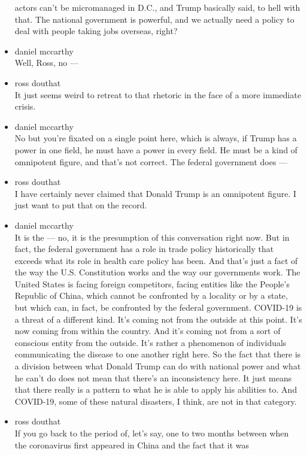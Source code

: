 \begin{itemize}
  actors can't be micromanaged in D.C., and Trump basically said, to
  hell with that. The national government is powerful, and we actually
  need a policy to deal with people taking jobs overseas, right?
\item
  daniel mccarthy\\
  Well, Ross, no ---
\item
  ross douthat\\
  It just seems weird to retreat to that rhetoric in the face of a more
  immediate crisis.
\item
  daniel mccarthy\\
  No but you're fixated on a single point here, which is always, if
  Trump has a power in one field, he must have a power in every field.
  He must be a kind of omnipotent figure, and that's not correct. The
  federal government does ---
\item
  ross douthat\\
  I have certainly never claimed that Donald Trump is an omnipotent
  figure. I just want to put that on the record.
\item
  daniel mccarthy\\
  It is the --- no, it is the presumption of this conversation right
  now. But in fact, the federal government has a role in trade policy
  historically that exceeds what its role in health care policy has
  been. And that's just a fact of the way the U.S. Constitution works
  and the way our governments work. The United States is facing foreign
  competitors, facing entities like the People's Republic of China,
  which cannot be confronted by a locality or by a state, but which can,
  in fact, be confronted by the federal government. COVID-19 is a threat
  of a different kind. It's coming not from the outside at this point.
  It's now coming from within the country. And it's coming not from a
  sort of conscious entity from the outside. It's rather a phenomenon of
  individuals communicating the disease to one another right here. So
  the fact that there is a division between what Donald Trump can do
  with national power and what he can't do does not mean that there's an
  inconsistency here. It just means that there really is a pattern to
  what he is able to apply his abilities to. And COVID-19, some of these
  natural disasters, I think, are not in that category.
\item
  ross douthat\\
  If you go back to the period of, let's say, one to two months between
  when the coronavirus first appeared in China and the fact that it was

\end{itemize}
